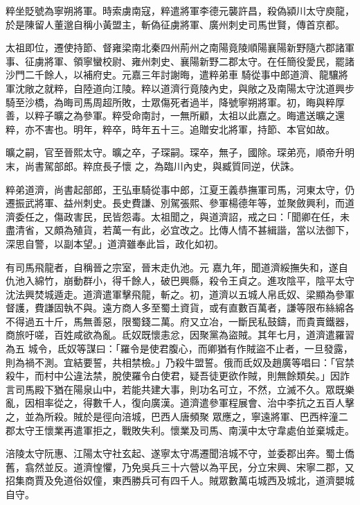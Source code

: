 \begin{pinyinscope}
 粹坐貶號為寧朔將軍。時索虜南寇，粹遣將軍李德元襲許昌，殺偽潁川太守庾龍，於是陳留人董邈自稱小黃盟主，斬偽征虜將軍、廣州刺史司馬世賢，傳首京都。



 太祖即位，遷使持節、督雍梁南北秦四州荊州之南陽竟陵順陽襄陽新野隨六郡諸軍事、征虜將軍、領寧蠻校尉、雍州刺史、襄陽新野二郡太守。在任簡役愛民，罷諸沙門二千餘人，以補府史。元嘉三年討謝晦，遣粹弟車
 騎從事中郎道濟、龍驤將軍沈敞之就粹，自陸道向江陵。粹以道濟行竟陵內史，與敞之及南陽太守沈道興步騎至沙橋，為晦司馬周超所敗，士眾傷死者過半，降號寧朔將軍。初，晦與粹厚善，以粹子曠之為參軍。粹受命南討，一無所顧，太祖以此嘉之。晦遣送曠之還粹，亦不害也。明年，粹卒，時年五十三。追贈安北將軍，持節、本官如故。



 曠之嗣，官至晉熙太守。曠之卒，子琛嗣。琛卒，無子，國除。琛弟亮，順帝升明末，尚書駕部郎。粹庶長子懷
 之，為臨川內史，與臧質同逆，伏誅。



 粹弟道濟，尚書起部郎，王弘車騎從事中郎，江夏王義恭撫軍司馬，河東太守，仍遷振武將軍、益州刺史。長史費謙、別駕張熙、參軍楊德年等，並聚斂興利，而道濟委任之，傷政害民，民皆怨毒。太祖聞之，與道濟詔，戒之曰：「聞卿在任，未盡清省，又頗為殖貨，若萬一有此，必宜改之。比傳人情不甚緝諧，當以法御下，深思自警，以副本望。」道濟雖奉此旨，政化如初。



 有司馬飛龍者，自稱晉之宗室，晉末走仇池。元
 嘉九年，聞道濟綏撫失和，遂自仇池入綿竹，崩動群小，得千餘人，破巴興縣，殺令王貞之。進攻陰平，陰平太守沈法興焚城遁走。道濟遣軍擊飛龍，斬之。初，道濟以五城人帛氐奴、梁顯為參軍督護，費謙固執不與。遠方商人多至蜀土資貨，或有直數百萬者，謙等限布絲綿各不得過五十斤，馬無善惡，限蜀錢二萬。府又立冶，一斷民私鼓鑄，而貴賣鐵器，商旅吁嗟，百姓咸欲為亂。氐奴既懷恚忿，因聚黨為盜賊。其年七月，道濟遣羅習為五
 城令，氐奴等謀曰：「羅令是使君腹心，而卿猶有作賊盜不止者，一旦發露，則為禍不測。宜結要誓，共相禁檢。」乃殺牛盟誓。俄而氐奴及趙廣等唱曰：「官禁殺牛，而村中公違法禁，脫使羅令白使君，疑吾徒更欲作賊，則無餘類矣。」因詐言司馬殿下猶在陽泉山中，若能共建大事，則功名可立，不然，立滅不久。眾既樂亂，因相率從之，得數千人，復向廣漢。道濟遣參軍程展會、治中李抗之五百人擊之，並為所殺。賊於是徑向涪城，巴西人唐頻聚
 眾應之，寧遠將軍、巴西梓潼二郡太守王懷業再遣軍拒之，戰敗失利。懷業及司馬、南漢中太守韋處伯並棄城走。



 涪陵太守阮惠、江陽太守社玄起、遂寧太守馮遷聞涪城不守，並委郡出奔。蜀土僑舊，翕然並反。道濟惶懼，乃免吳兵三十六營以為平民，分立宋興、宋寧二郡，又招集商賈及免道俗奴僮，東西勝兵可有四千人。賊眾數萬屯城西及城北，道濟嬰城自守。




\end{pinyinscope}

